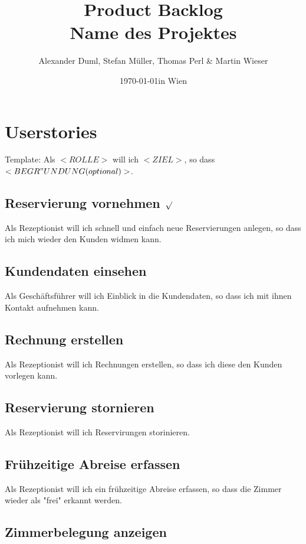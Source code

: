 \documentclass[11pt]{scrartcl}
\title{Product Backlog \\ \large Name des Projektes}
\author{Alexander Duml, Stefan Müller, Thomas Perl \& Martin Wieser}
\date{\today in Wien}
\begin{document}
\maketitle

\section{Userstories}

Template: Als $<ROLLE>$ will ich $<ZIEL>$, so dass $<BEGR"UNDUNG (optional)>$.

\subsection{Reservierung vornehmen $\surd$}

Als Rezeptionist will ich schnell und einfach neue Reservierungen anlegen, so dass ich mich wieder den Kunden widmen kann.

\subsection{Kundendaten einsehen}

Als Geschäftsführer will ich Einblick in die Kundendaten, so dass ich mit ihnen Kontakt aufnehmen kann.

\subsection{Rechnung erstellen}

Als Rezeptionist will ich Rechnungen erstellen, so dass ich diese den Kunden vorlegen kann.

\subsection{Reservierung stornieren}

Als Rezeptionist will ich Reservirungen storinieren.

\subsection{Frühzeitige Abreise erfassen}

Als Rezeptionist will ich ein frühzeitige Abreise erfassen, so dass die Zimmer wieder als "frei" erkannt werden.

\subsection{Zimmerbelegung anzeigen}
\end{document}
